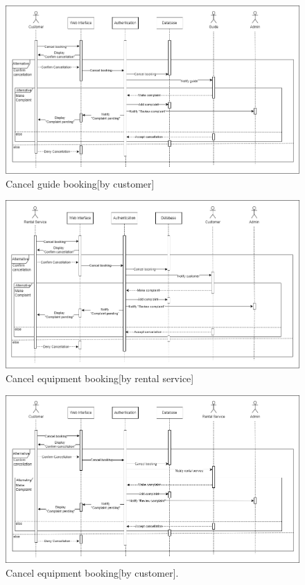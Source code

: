 \begin{figure}[h!]
    \centering
    \includegraphics[width=1\textwidth]{Images/Sequence Diagrams/Sequence diagrams-15-Cancel guide booking[by customer].drawio.png}
    \caption{Cancel guide booking[by customer]}
\end{figure}

\begin{figure}[h!]
    \centering
    \includegraphics[width=1\textwidth]{Images/Sequence Diagrams/Sequence diagrams-16-Cancel equipment booking[by rental service].drawio.png}
    \caption{Cancel equipment booking[by rental service]}
\end{figure}

\begin{figure}[h!]
    \centering
    \includegraphics[width=1\textwidth]{Images/Sequence Diagrams/Sequence diagrams-17-Cancel equipment booking[by customer].drawio.png}
    \caption{Cancel equipment booking[by customer].}
\end{figure}


